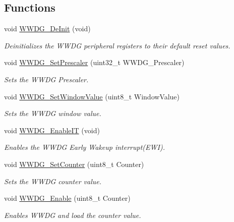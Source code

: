 \subsection*{Functions}
\begin{DoxyCompactItemize}
\item 
void \hyperlink{group___w_w_d_g_ga7130f4dc861b9234b62e73f9f57f89a1}{W\-W\-D\-G\-\_\-\-De\-Init} (void)
\begin{DoxyCompactList}\small\item\em Deinitializes the W\-W\-D\-G peripheral registers to their default reset values. \end{DoxyCompactList}\item 
void \hyperlink{group___w_w_d_g_gafeaa2b52c31ba7baca7eb61d2d42e07b}{W\-W\-D\-G\-\_\-\-Set\-Prescaler} (uint32\-\_\-t W\-W\-D\-G\-\_\-\-Prescaler)
\begin{DoxyCompactList}\small\item\em Sets the W\-W\-D\-G Prescaler. \end{DoxyCompactList}\item 
void \hyperlink{group___w_w_d_g_gaf44a7bf8bf6b11b41cd89ff521fdd5a5}{W\-W\-D\-G\-\_\-\-Set\-Window\-Value} (uint8\-\_\-t Window\-Value)
\begin{DoxyCompactList}\small\item\em Sets the W\-W\-D\-G window value. \end{DoxyCompactList}\item 
void \hyperlink{group___w_w_d_g_gac8af66ea5254d3d78b60b9b7c7f29521}{W\-W\-D\-G\-\_\-\-Enable\-I\-T} (void)
\begin{DoxyCompactList}\small\item\em Enables the W\-W\-D\-G Early Wakeup interrupt(\-E\-W\-I). \end{DoxyCompactList}\item 
void \hyperlink{group___w_w_d_g_ga6e44cc35f133b28b9ad861f459bf8d76}{W\-W\-D\-G\-\_\-\-Set\-Counter} (uint8\-\_\-t Counter)
\begin{DoxyCompactList}\small\item\em Sets the W\-W\-D\-G counter value. \end{DoxyCompactList}\item 
void \hyperlink{group___w_w_d_g_ga10dc2554d0b504b5472e3ecf0f02a9e6}{W\-W\-D\-G\-\_\-\-Enable} (uint8\-\_\-t Counter)
\begin{DoxyCompactList}\small\item\em Enables W\-W\-D\-G and load the counter value. \end{DoxyCompactList}\item 

\end{DoxyCompactItemize}
